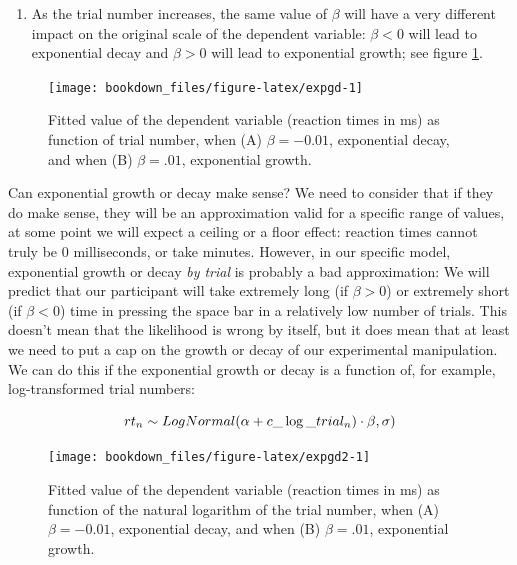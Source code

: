 \documentclass[12pt,]{krantz}
\providecommand{\tightlist}{%
  \setlength{\itemsep}{0pt}\setlength{\parskip}{0pt}}
\theoremstyle{definition}
\theoremstyle{definition}
\theoremstyle{definition}
\theoremstyle{remark}
\begin{document}
\begin{enumerate}
\def\labelenumi{\arabic{enumi}.}
\setcounter{enumi}{1}
\tightlist
\item
  As the trial number increases, the same value of \(\beta\) will have a very different impact on the original scale of the dependent variable: \(\beta <0\) will lead to exponential decay and \(\beta >0\) will lead to exponential growth; see figure \ref{fig:expgd}.
\end{enumerate}



\begin{figure}[H]
\texttt{[image: bookdown\_files/figure-latex/expgd-1]} \caption{Fitted value of the dependent variable (reaction times in ms) as function of trial number, when (A) \(\beta = -0.01\), exponential decay, and when (B) \(\beta =.01\), exponential growth.}\label{fig:expgd}
\end{figure}

Can exponential growth or decay make sense? We need to consider that if they do make sense, they will be an approximation valid for a specific range of values, at some point we will expect a ceiling or a floor effect: reaction times cannot truly be 0 milliseconds, or take minutes. However, in our specific model, exponential growth or decay \emph{by trial} is probably a bad approximation: We will predict that our participant will take extremely long (if \(\beta >0\)) or extremely short (if \(\beta <0\)) time in pressing the space bar in a relatively low number of trials. This doesn't mean that the likelihood is wrong by itself, but it does mean that at least we need to put a cap on the growth or decay of our experimental manipulation. We can do this if the exponential growth or decay is a function of, for example, log-transformed trial numbers:

\begin{equation}
rt_n \sim LogNormal(\alpha + c\_\log\_trial_n) \cdot \beta,\sigma)\\
\end{equation}



\begin{figure}[H]
\texttt{[image: bookdown\_files/figure-latex/expgd2-1]} \caption{Fitted value of the dependent variable (reaction times in ms) as function of the natural logarithm of the trial number, when (A) \(\beta=-0.01\), exponential decay, and when (B) \(\beta =.01\), exponential growth.}\label{fig:expgd2}
\end{figure}
\end{document}
